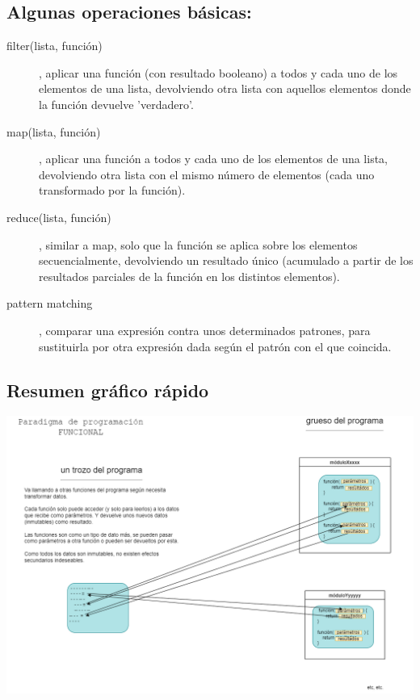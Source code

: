 \documentclass[spanish,12pt,a4paper,final,oneside]{book}
\begin{document}
\subsection*{Algunas operaciones básicas:}

\begin{description}

\item[filter(lista, función)], aplicar una función (con resultado booleano) a todos y cada uno de los elementos de una lista, devolviendo otra lista con aquellos elementos donde la función devuelve 'verdadero'.

\item[map(lista, función)], aplicar una función a todos y cada uno de los elementos de una lista, devolviendo otra lista con el mismo número de elementos (cada uno transformado por la función).

\item[reduce(lista, función)], similar a map, solo que la función se aplica sobre los elementos secuencialmente, devolviendo un resultado único (acumulado a partir de los resultados parciales de la función en los distintos elementos).

\item[pattern matching], comparar una expresión contra unos determinados patrones, para sustituirla por otra expresión dada según el patrón con el que coincida.

\end{description}


\subsection*{Resumen gráfico rápido}
\includegraphics[width=\textwidth]{Paradigma de programacion - FUNCIONAL}
\end{document}
